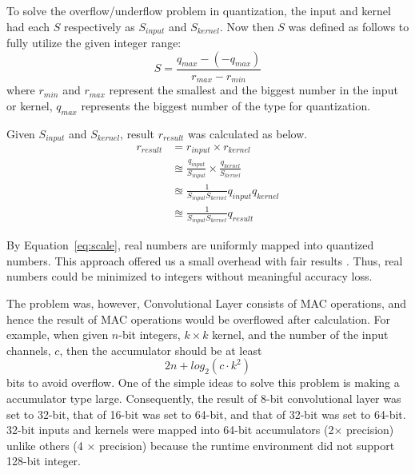 \documentclass[a4paper,12pt]{article}
\begin{document}
\begin{enumerate}
\begin{answer}
				To solve the overflow/underflow problem in quantization, the input and kernel had each $S$ respectively as $S_{input}$ and $S_{kernel}$.
				Now then $S$ was defined as follows to fully utilize the given integer range:
				\begin{equation}\label{eq:scale}
					S = \frac{q_{max} - (-q_{max})}{r_{max}- r_{min}}
				\end{equation}
				where $r_{min}$ and $r_{max}$ represent the smallest and the biggest number in the input or kernel, $q_{max}$ represents the biggest number of the type for quantization.

				Given $S_{input}$ and $S_{kernel}$, result $r_{result}$ was calculated as below.
				\begin{equation}
					\begin{split}
						r_{result} & = r_{input} \times r_{kernel} \\ 
								& \approxeq \frac{q_{input}}{S_{input}} \times \frac{q_{kernel}}{S_{kernel}} \\
								& \approxeq  \frac{1}{S_{input}S_{kernel}} q_{input} q_{kernel} \\
								& \approxeq \frac{1}{S_{input}S_{kernel}} q_{result}
					\end{split}
				\end{equation}

				By Equation~\ref{eq:scale}, real numbers are uniformly mapped into quantized numbers. 
				This approach offered us a small overhead with fair results \cite{jacob2018quantization}.
				Thus, real numbers could be minimized to integers without meaningful accuracy loss.

				The problem was, however, Convolutional Layer consists of MAC operations, and hence the result of MAC operations would be overflowed after calculation.
				For example, when given $n$-bit integers, $k \times k$ kernel, and the number of the input channels, $c$, then 
				the accumulator should be at least \begin{equation}\label{eq:bits} 2n + log_2{(c \cdot k^2)} \end{equation} bits to avoid overflow.
				One of the simple ideas to solve this problem is making a accumulator type large.
				Consequently, the result of 8-bit convolutional layer was set to 32-bit, that of 16-bit was set to 64-bit, and that of 32-bit was set to 64-bit. 
				32-bit inputs and kernels were mapped into 64-bit accumulators (2$\times$ precision) unlike others (4 $\times$ precision) because the runtime environment did not support 128-bit integer.


\end{answer}
\end{enumerate}
\end{document}
